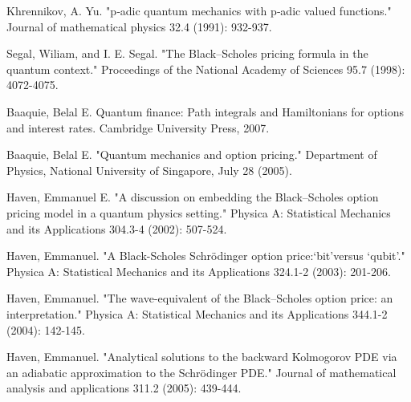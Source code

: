 \documentclass[a4paper,titlepage,12pt,fleqn,oneside]{report}
\begin{document}
\begin{thebibliography}{99}
\begin{LTRitems}
	Khrennikov, A. Yu. "p‐adic quantum mechanics with p‐adic valued functions." Journal of mathematical physics 32.4 (1991): 932-937.
\end{LTRitems}

\begin{LTRitems}
	Segal, Wiliam, and I. E. Segal. "The Black–Scholes pricing formula in the quantum context." Proceedings of the National Academy of Sciences 95.7 (1998): 4072-4075.
\end{LTRitems}

\begin{LTRitems}
	Baaquie, Belal E. Quantum finance: Path integrals and Hamiltonians for options and interest rates. Cambridge University Press, 2007.
\end{LTRitems}

\begin{LTRitems}
	Baaquie, Belal E. "Quantum mechanics and option pricing." Department of Physics, National University of Singapore, July 28 (2005).
\end{LTRitems}

\begin{LTRitems}
	Haven, Emmanuel E. "A discussion on embedding the Black–Scholes option pricing model in a quantum physics setting." Physica A: Statistical Mechanics and its Applications 304.3-4 (2002): 507-524.
\end{LTRitems}

\begin{LTRitems}
	Haven, Emmanuel. "A Black-Scholes Schrödinger option price:‘bit’versus ‘qubit’." Physica A: Statistical Mechanics and its Applications 324.1-2 (2003): 201-206.
\end{LTRitems}

\begin{LTRitems}
	Haven, Emmanuel. "The wave-equivalent of the Black–Scholes option price: an interpretation." Physica A: Statistical Mechanics and its Applications 344.1-2 (2004): 142-145.
\end{LTRitems}

\begin{LTRitems}
	Haven, Emmanuel. "Analytical solutions to the backward Kolmogorov PDE via an adiabatic approximation to the Schrödinger PDE." Journal of mathematical analysis and applications 311.2 (2005): 439-444.
\end{LTRitems}


\end{thebibliography}
\end{document}
